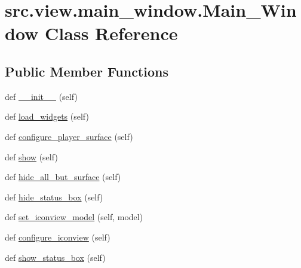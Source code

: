 \hypertarget{classsrc_1_1view_1_1main__window_1_1Main__Window}{}\section{src.\+view.\+main\+\_\+window.\+Main\+\_\+\+Window Class Reference}
\label{classsrc_1_1view_1_1main__window_1_1Main__Window}
\subsection*{Public Member Functions}
\begin{DoxyCompactItemize}
\item 
def \hyperlink{classsrc_1_1view_1_1main__window_1_1Main__Window_a32681e00aa96329d5efa55ccff515df5}{\+\_\+\+\_\+init\+\_\+\+\_\+} (self)
\item 
def \hyperlink{classsrc_1_1view_1_1main__window_1_1Main__Window_a0af024b0e5acf5bccc78cf981db3315c}{load\+\_\+widgets} (self)
\item 
def \hyperlink{classsrc_1_1view_1_1main__window_1_1Main__Window_ac8d8a07d9c41d691c381e73ad01373f5}{configure\+\_\+player\+\_\+surface} (self)
\item 
def \hyperlink{classsrc_1_1view_1_1main__window_1_1Main__Window_ad235181101478284d4b5814bf5fb4946}{show} (self)
\item 
def \hyperlink{classsrc_1_1view_1_1main__window_1_1Main__Window_a10419593f96de2189a42dd7e653db96e}{hide\+\_\+all\+\_\+but\+\_\+surface} (self)
\item 
def \hyperlink{classsrc_1_1view_1_1main__window_1_1Main__Window_aed44804170e4d25059193be23c1b10b7}{hide\+\_\+status\+\_\+box} (self)
\item 
def \hyperlink{classsrc_1_1view_1_1main__window_1_1Main__Window_a06efdb17d5f1ef2a581e3895d39c6318}{set\+\_\+iconview\+\_\+model} (self, model)
\item 
def \hyperlink{classsrc_1_1view_1_1main__window_1_1Main__Window_a8ff8560acfe7f73cc51ab9c0222e3c08}{configure\+\_\+iconview} (self)
\item 
def \hyperlink{classsrc_1_1view_1_1main__window_1_1Main__Window_a3dae99e159addc4d9b443354b6f8587d}{show\+\_\+status\+\_\+box} (self)
\end{DoxyCompactItemize}
